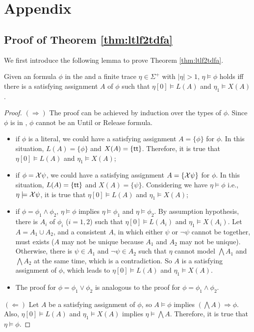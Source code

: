 \section{Appendix}
\subsection{Proof of Theorem \ref{thm:ltlf2tdfa}}

We first introduce the following lemma to prove Theorem \ref{thm:ltlf2tdfa}.

\begin{lemma}\label{lem:propSat}
Given an \ltlf formula $\phi$ in the \XNF and a finite trace $\eta\in\Sigma^+$ with $|\eta|>1$, $\eta\models\phi$ holds iff there is a satisfying assignment $A$ of $\phi$ such that $\eta[0]\models L(A)$ and $\eta_1\models X(A)$.
\end{lemma}
\begin{proof}
$(\Rightarrow)$ The proof can be achieved by induction over the types of $\phi$. Since $\phi$ is in \XNF, $\phi$ cannot be an Until or Release formula.
\begin{itemize}
	\item if $\phi$ is a literal,  we could have a satisfying assignment $A=\{\phi\}$ for $\phi$. In this situation, $L(A)=\{\phi\}$ and $X(A)=\{\tt\}$. Therefore, it is true that $\eta[0]\models L(A)$ and $\eta_1\models X(A)$;
	\item if $\phi=\X\psi$, we could have a satisfying assignment $A=\{\X\psi\}$ for $\phi$. In this situation, $L(A)=\{\tt\}$ and $X(A)=\{\psi\}$. Considering we have $\eta\models\phi$ i.e., $\eta\models\X\psi$, it is true that $\eta[0]\models L(A)$ and $\eta_1\models X(A)$;
	\item if $\phi = \phi_1\wedge\phi_2$, $\eta\models\phi$ 
implies $\eta\models\phi_1$ and $\eta\models\phi_2$. By assumption hypothesis, there is $A_i$ of $\phi_i$ ($i=1,2$) such that 
$\eta[0]\models L(A_i)$ and $\eta_1\models X(A_i)$. Let $A = A_1\cup A_2$, and a consistent $A$, in which either $\psi$ or $\neg \psi$ cannot be together, 
must exists ($A$ may not be unique because $A_1$ and $A_2$ may not be unique). 
Otherwise, there is $\psi\in A_1$ and $\neg\psi\in A_2$ 
such that $\eta$ cannot model $\bigwedge A_1$ and $\bigwedge A_2$ at the same time, which is a contradiction. So $A$ is a satisfying  assignment of $\phi$, which leads to $\eta[0]\models L(A)$ and $\eta_1\models X(A)$. 
\item The proof for $\phi=\phi_1\vee\phi_2$ is analogous to the proof for $\phi = \phi_1\wedge\phi_2$.
\end{itemize} 

$(\Leftarrow)$ Let $A$ be a satisfying assignment of $\phi$, so $A\models\phi$ implies $(\bigwedge A)\Rightarrow \phi$. 
Also, $\eta[0]\models L(A)$ and $\eta_1\models X(A)$ implies $\eta\models \bigwedge A$. Therefore, it is true that $\eta\models \phi$.
\end{proof}

